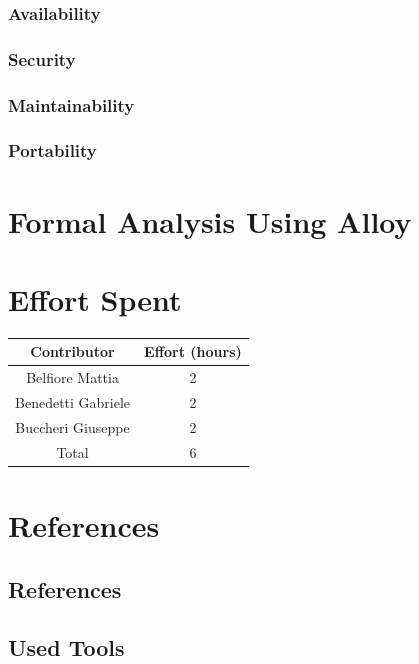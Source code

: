 \documentclass[11pt,twoside]{article}
\begin{document}
\subsubsection{Availability}
\subsubsection{Security}
\subsubsection{Maintainability}
\subsubsection{Portability}

\section{Formal Analysis Using Alloy}

\section{Effort Spent}

\noindent\begin{tabular}{|c|c|}

\hline
\textbf{Contributor} & \textbf{Effort (hours)} \\ \hline
Belfiore Mattia & 2 \\ \hline
Benedetti Gabriele & 2 \\ \hline
Buccheri Giuseppe & 2 \\ \hline
Total & 6 \\ \hline
\end{tabular}

\section{References}

\subsection{References}
\subsection{Used Tools}


\end{document}
